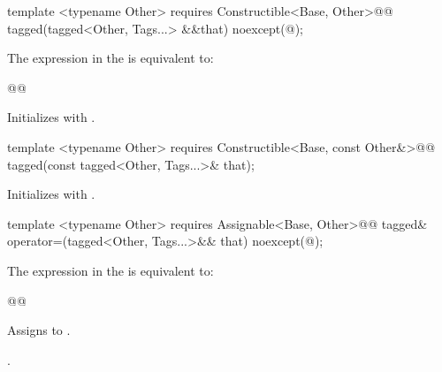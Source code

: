 {
\begin{itemdecl}
template <typename Other>
  requires Constructible<Base, Other>@\newtxt{()}@
tagged(tagged<Other, Tags...> &&that) noexcept(@\seebelow@);
\end{itemdecl}

\begin{itemdescr}
\pnum
\remarks The expression in the  is equivalent to:

\begin{codeblock}
@@
\end{codeblock}

\pnum
\effects Initializes  with .
\end{itemdescr}

\begin{itemdecl}
template <typename Other>
  requires Constructible<Base, const Other&>@\newtxt{()}@
tagged(const tagged<Other, Tags...>& that);
\end{itemdecl}

\begin{itemdescr}
\pnum
\effects Initializes  with .
\end{itemdescr}

\begin{itemdecl}
template <typename Other>
  requires Assignable<Base, Other>@\newtxt{()}@
tagged& operator=(tagged<Other, Tags...>&& that) noexcept(@\seebelow@);
\end{itemdecl}

\begin{itemdescr}
\pnum
\remarks The expression in the  is equivalent to:

\begin{codeblock}
@@
\end{codeblock}

\pnum
\effects Assigns  to .

\pnum
\returns {}.
\end{itemdescr}

}
